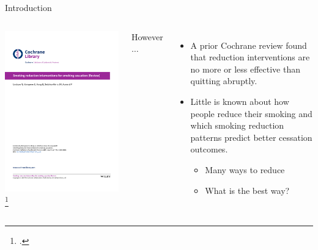 \documentclass[aspectratio=169]{beamer}
\begin{document}
\begin{frame}{Introduction}
		\begin{columns}
			\includegraphics[width=\columnwidth]{lindson19}
			\footcite{lindsonSmokingReductionInterventions2019}
	
			However $\ldots$
			\vspace{5mm}
		
			\begin{itemize}
				\item A prior Cochrane review found that reduction interventions are no more or less effective than quitting abruptly.
				\pause
				\item Little is known about how people reduce their smoking and which smoking reduction patterns predict better cessation outcomes.
				\begin{itemize}
					\item Many ways to reduce 
					\item What is the best way?
				\end{itemize}
			\end{itemize}
		\end{columns}
\end{frame}
\end{document}
